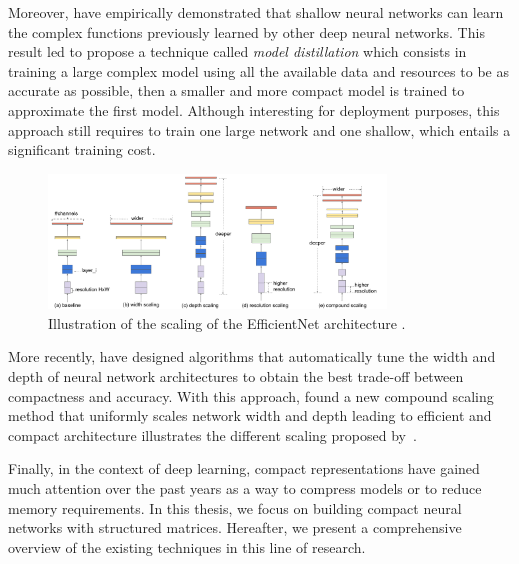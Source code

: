 Moreover, \citet{ba2014deep} have empirically demonstrated that shallow neural networks can learn the complex functions previously learned by other deep neural networks.
This result led \citet{hinton2015distilling} to propose a technique called \emph{model distillation} which consists in training a large complex model using all the available data and resources to be as accurate as possible, then a smaller and more compact model is trained to approximate the first model.
Although interesting for deployment purposes, this approach still requires to train one large network and one shallow, which entails a significant training cost.

\begin{figure}[t]
  \centering
  \includegraphics[width=0.80\textwidth]{figures/main/ch3-related_work/scalecompare.pdf}
  \caption{Illustration of the scaling of the EfficientNet architecture \cite{tan2019efficientnet}.}
  \label{figure:p1-ch3-illustration_efficientnet}
\end{figure}

More recently, \citet{zoph2018learning,real2019regularized} have designed algorithms that automatically tune the width and depth of neural network architectures to obtain the best trade-off between compactness and accuracy.
With this approach, \citet{tan2019efficientnet} found a new compound scaling method that uniformly scales network width and depth leading to efficient and compact architecture illustrates the different scaling proposed by~\citet{tan2019efficientnet}.

Finally, in the context of deep learning, compact representations have gained much attention over the past years as a way to compress models or to reduce memory requirements.
In this thesis, we focus on building compact neural networks with structured matrices.
Hereafter, we present a comprehensive overview of the existing techniques in this line of research.












